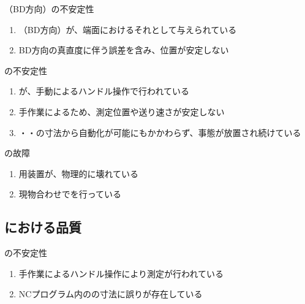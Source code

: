 \begin{Issues}{\KeywayCenterMeasurement（BD方向）の不安定性}
\begin{enumerate}[label=\sarrow]
\item[{\sarrow[red]}]\KeywayCenter（BD方向）が、端面におけるそれとして与えられている
\item[{\sarrow[red]}]BD方向の真直度に伴う誤差を含み、位置が安定しない
\end{enumerate}
\end{Issues}

\begin{Issues}{\CenterlineEndFaceDifMeasurement の不安定性}
\begin{enumerate}[label=\sarrow]
\item[{\sarrow[red]}]\CenterlineEndFaceDifMeasurement が、手動によるハンドル操作で行われている
\item[{\sarrow[red]}]手作業によるため、測定位置や送り速さが安定しない
\item[{\sarrow[red]}]\Outcut・\Keyway・\CenterCurvature の寸法から自動化が可能にもかかわらず、事態が放置され続けている
\end{enumerate}
\end{Issues}

\begin{Issues}{\TLMeasurement の故障}
\begin{enumerate}[label=\sarrow]
\item\TLMeasurement 用装置が、物理的に壊れている
\item 現物合わせで\TLMeasurement を行っている
\end{enumerate}
\end{Issues}


\subsection{\OutcutMilling における品質}

\begin{Issues}{\CurvedOutcutMilling の不安定性}
\begin{enumerate}[label=\sarrow]
\item[{\sarrow[red]}]手作業によるハンドル操作により測定が行われている
\item[{\sarrow[red]}]NCプログラム内の\OutcutLength の寸法に誤りが存在している
\end{enumerate}
\end{Issues}


